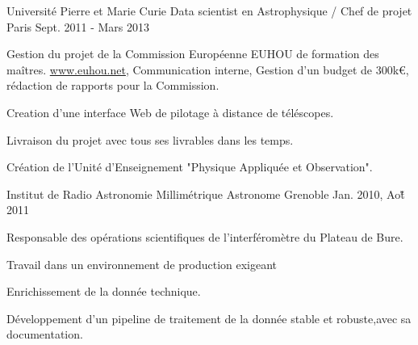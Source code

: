 \begin{cventries}
  \cventry
    {Université Pierre et Marie Curie} %
    {Data scientist en Astrophysique / Chef de projet} %
    {Paris} %
    {Sept. 2011 - Mars 2013} %
    {
      \begin{cvitems} %
        \item Gestion du projet de la Commission Européenne EUHOU de formation des maîtres. \url{www.euhou.net}, Communication interne, Gestion d'un budget de 300k\euro, rédaction de rapports pour la Commission.
        \item Creation d'une interface Web de pilotage à distance de téléscopes.
        \item Livraison du projet avec tous ses livrables dans les temps.
        \item Création de l'Unité d'Enseignement "Physique Appliquée et Observation". 
      \end{cvitems}
    }

  \cventry
    {Institut de Radio Astronomie Millimétrique} %
    {Astronome} %
    {Grenoble} %
    {Jan. 2010, Ao\^\u t 2011} %
    {
      \begin{cvitems} 
        \item Responsable des opérations scientifiques de l'interféromètre du Plateau de Bure.
        \item Travail dans un environnement de production exigeant
        \item Enrichissement de la donnée technique.
        \item Développement d'un pipeline de traitement de la donnée stable et robuste,avec sa documentation.
      \end{cvitems}
    }

\end{cventries}
